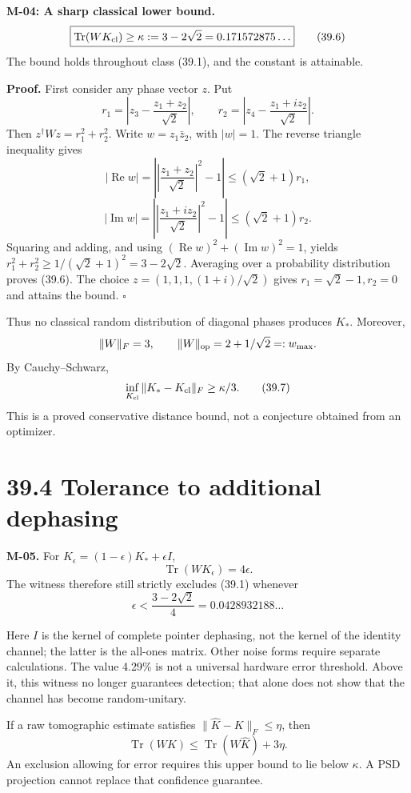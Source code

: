 \documentclass[
  11pt,
  oneside]{book}
\begin{document}
\label{m-04}{}

\textbf{M-04: A sharp classical lower bound.} \[
\boxed{\operatorname{Tr}(WK_{\rm cl})\ge
\kappa:=3-2\sqrt2=0.171572875\ldots}
\tag{39.6}
\] The bound holds throughout class (39.1), and the constant is
attainable.

\textbf{Proof.} First consider any phase vector \(z\). Put \[
r_1=\left|z_3-\frac{z_1+z_2}{\sqrt2}\right|,\qquad
r_2=\left|z_4-\frac{z_1+iz_2}{\sqrt2}\right|.
\] Then \(z^\dagger Wz=r_1^2+r_2^2\). Write \(w=z_1\bar z_2\), with
\(|w|=1\). The reverse triangle inequality gives \[
|\operatorname{Re}w|
=\left|\left|\frac{z_1+z_2}{\sqrt2}\right|^2-1\right|
\le(\sqrt2+1)r_1,
\] \[
|\operatorname{Im}w|
=\left|\left|\frac{z_1+iz_2}{\sqrt2}\right|^2-1\right|
\le(\sqrt2+1)r_2.
\] Squaring and adding, and using
\((\operatorname{Re}w)^2+(\operatorname{Im}w)^2=1\), yields
\(r_1^2+r_2^2\ge1/(\sqrt2+1)^2=3-2\sqrt2\). Averaging over a probability
distribution proves (39.6). The choice \(z=(1,1,1,(1+i)/\sqrt2)\) gives
\(r_1=\sqrt2-1,r_2=0\) and attains the bound. \(\square\)

Thus no classical random distribution of diagonal phases produces
\(K_*\). Moreover, \[
\|W\|_F=3,\qquad \|W\|_{\rm op}=2+1/\sqrt2=:w_{\max}.
\] By Cauchy--Schwarz, \[
\inf_{K_{\rm cl}}\|K_*-K_{\rm cl}\|_F\ge\kappa/3.
\tag{39.7}
\] This is a proved conservative distance bound, not a conjecture
obtained from an optimizer.

\section{39.4 Tolerance to additional dephasing}

\label{m-05}{}

\textbf{M-05.} For \(K_\epsilon=(1-\epsilon)K_*+\epsilon I\), \[
\operatorname{Tr}(WK_\epsilon)=4\epsilon.
\] The witness therefore still strictly excludes (39.1) whenever \[
\epsilon<\frac{3-2\sqrt2}{4}=0.0428932188\ldots
\tag{39.8}
\]

Here \(I\) is the kernel of complete pointer dephasing, not the kernel
of the identity channel; the latter is the all-ones matrix. Other noise
forms require separate calculations. The value 4.29\% is not a universal
hardware error threshold. Above it, this witness no longer guarantees
detection; that alone does not show that the channel has become
random-unitary.

If a raw tomographic estimate satisfies \(\|\widehat K-K\|_F\le\eta\),
then \[
\operatorname{Tr}(WK)\le \operatorname{Tr}(W\widehat K)+3\eta.
\] An exclusion allowing for error requires this upper bound to lie
below \(\kappa\). A PSD projection cannot replace that confidence
guarantee.
\end{document}
